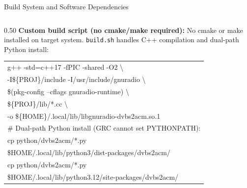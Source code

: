 \documentclass[aspectratio=169,10pt]{beamer}
\begin{document}
\begin{frame}[shrink=20]{Build System and Software Dependencies}
  \begin{columns}[T]
    \begin{column}{0.50\textwidth}
      \textbf{Custom build script (no cmake/make required):}
      \scriptsize No cmake or make installed on target system.
      \texttt{build.sh} handles C++ compilation and dual-path Python install:

      {\scriptsize\ttfamily
      \begin{tabular}{p{7cm}}
        g++ -std=c++17 -fPIC -shared -O2 \textbackslash\\
        \quad -I\$\{PROJ\}/include -I/usr/include/gnuradio \textbackslash\\
        \quad \$(pkg-config --cflags gnuradio-runtime) \textbackslash\\
        \quad \$\{PROJ\}/lib/*.cc \textbackslash\\
        \quad -o \$\{HOME\}/.local/lib/libgnuradio-dvbs2acm.so.1\\[4pt]
        \# Dual-path Python install (GRC cannot set PYTHONPATH):\\
        cp python/dvbs2acm/*.py\\
        \quad \$HOME/.local/lib/python3/dist-packages/dvbs2acm/\\
        cp python/dvbs2acm/*.py\\
        \quad \$HOME/.local/lib/python3.12/site-packages/dvbs2acm/
      \end{tabular}}


\end{column}
\end{columns}
\end{frame}
\end{document}
